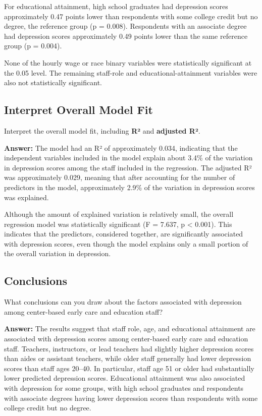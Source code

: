 \documentclass[
]{article}
\begin{document}
For educational attainment, high school graduates had depression scores
approximately 0.47 points lower than respondents with some college
credit but no degree, the reference group (p = 0.008). Respondents with
an associate degree had depression scores approximately 0.49 points
lower than the same reference group (p = 0.004).

None of the hourly wage or race binary variables were statistically
significant at the 0.05 level. The remaining staff-role and
educational-attainment variables were also not statistically
significant.

\newpage

\subsection{Interpret Overall Model
Fit}\label{interpret-overall-model-fit}

Interpret the overall model fit, including \textbf{R²} and
\textbf{adjusted R²}.

\textbf{Answer:} The model had an R² of approximately 0.034, indicating
that the independent variables included in the model explain about 3.4\%
of the variation in depression scores among the staff included in the
regression. The adjusted R² was approximately 0.029, meaning that after
accounting for the number of predictors in the model, approximately
2.9\% of the variation in depression scores was explained.

Although the amount of explained variation is relatively small, the
overall regression model was statistically significant (F = 7.637, p
\textless{} 0.001). This indicates that the predictors, considered
together, are significantly associated with depression scores, even
though the model explains only a small portion of the overall variation
in depression.

\newpage

\subsection{Conclusions}\label{conclusions}

What conclusions can you draw about the factors associated with
depression among center-based early care and education staff?

\textbf{Answer:} The results suggest that staff role, age, and
educational attainment are associated with depression scores among
center-based early care and education staff. Teachers, instructors, or
lead teachers had slightly higher depression scores than aides or
assistant teachers, while older staff generally had lower depression
scores than staff ages 20--40. In particular, staff age 51 or older had
substantially lower predicted depression scores. Educational attainment
was also associated with depression for some groups, with high school
graduates and respondents with associate degrees having lower depression
scores than respondents with some college credit but no degree.
\end{document}
